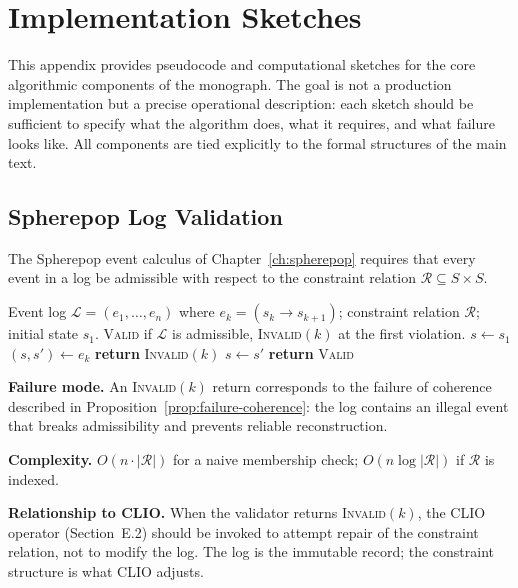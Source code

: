 \documentclass[11pt,openany]{book}
\begin{document}
\chapter{Implementation Sketches}
\label{app:implementation}

This appendix provides pseudocode and computational sketches
for the core algorithmic components of the monograph.  The
goal is not a production implementation but a precise
operational description: each sketch should be sufficient
to specify what the algorithm does, what it requires, and
what failure looks like.  All components are tied
explicitly to the formal structures of the main text.

\section{Spherepop Log Validation}
\label{sec:spherepop-impl}

The Spherepop event calculus of Chapter~\ref{ch:spherepop}
requires that every event in a log be admissible with
respect to the constraint relation $\mathcal{R} \subseteq
S \times S$.

\begin{algorithm}
\caption{Spherepop Log Validation}
\label{alg:spherepop}
\begin{algorithmic}
\Require Event log $\mathcal{L} = (e_1, \ldots, e_n)$
  where $e_k = (s_k \to s_{k+1})$; constraint relation
  $\mathcal{R}$; initial state $s_1$.
\Ensure \textsc{Valid} if $\mathcal{L}$ is admissible,
  \textsc{Invalid}$(k)$ at the first violation.
\State $s \gets s_1$
  \State $(s, s') \gets e_k$
    \State \textbf{return} \textsc{Invalid}$(k)$
  \EndIf
  \State $s \gets s'$
\EndFor
\State \textbf{return} \textsc{Valid}
\end{algorithmic}
\end{algorithm}

\textbf{Failure mode.} An \textsc{Invalid}$(k)$ return
corresponds to the failure of coherence described in
Proposition~\ref{prop:failure-coherence}: the log contains
an illegal event that breaks admissibility and prevents
reliable reconstruction.

\textbf{Complexity.} $O(n \cdot |\mathcal{R}|)$ for a
naive membership check; $O(n \log |\mathcal{R}|)$ if
$\mathcal{R}$ is indexed.

\textbf{Relationship to CLIO.} When the validator returns
\textsc{Invalid}$(k)$, the CLIO operator (Section~E.2)
should be invoked to attempt repair of the constraint
relation, not to modify the log.  The log is the immutable
record; the constraint structure is what CLIO adjusts.
\end{document}

